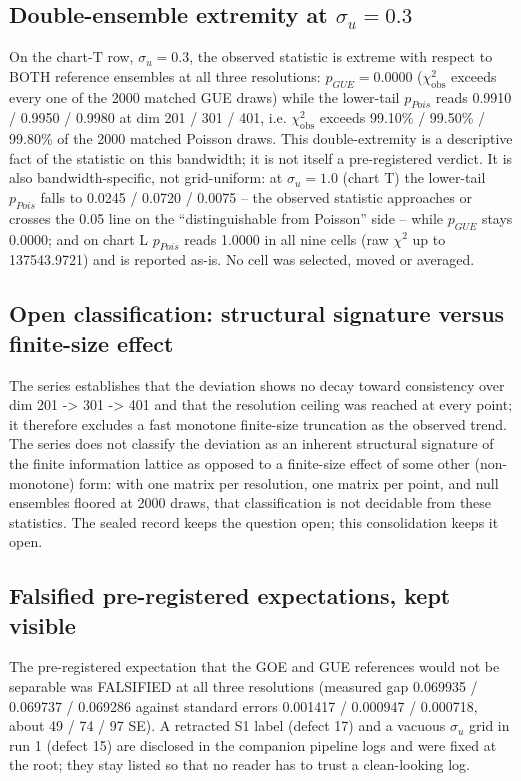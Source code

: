 \documentclass[11pt]{article}
\begin{document}
\subsection{Double-ensemble extremity at $\sigma_u = 0.3$}
On the chart-T row, $\sigma_u = 0.3$, the observed statistic is extreme
with respect to BOTH reference ensembles at all three resolutions:
$p_{GUE} = 0.0000$ ($\chi^2_{\mathrm{obs}}$ exceeds every one of the
2000 matched GUE draws) while the lower-tail $p_{Pois}$ reads 0.9910 /
0.9950 / 0.9980 at dim 201 / 301 / 401, i.e.
$\chi^2_{\mathrm{obs}}$ exceeds 99.10\% / 99.50\% / 99.80\% of the 2000
matched Poisson draws. This double-extremity is a descriptive fact of
the statistic on this bandwidth; it is not itself a pre-registered
verdict. It is also bandwidth-specific, not grid-uniform: at
$\sigma_u = 1.0$ (chart T) the lower-tail $p_{Pois}$ falls to 0.0245 /
0.0720 / 0.0075 -- the observed statistic approaches or crosses the
0.05 line on the ``distinguishable from Poisson'' side -- while
$p_{GUE}$ stays 0.0000; and on chart L $p_{Pois}$ reads 1.0000 in all
nine cells (raw $\chi^2$ up to 137543.9721) and is reported as-is. No
cell was selected, moved or averaged.

\subsection{Open classification: structural signature versus
finite-size effect}
The series establishes that the deviation shows no decay toward
consistency over dim 201 -> 301 -> 401 and that the resolution ceiling
was reached at every point; it therefore excludes a fast monotone
finite-size truncation as the observed trend. The series does not
classify the deviation as an inherent structural signature of the
finite information lattice as opposed to a finite-size effect of some
other (non-monotone) form: with one matrix per resolution, one matrix
per point, and null ensembles floored at 2000 draws, that classification
is not decidable from these statistics. The sealed record keeps the
question open; this consolidation keeps it open.

\subsection{Falsified pre-registered expectations, kept visible}
The pre-registered expectation that the GOE and GUE references would
not be separable was FALSIFIED at all three resolutions (measured gap
0.069935 / 0.069737 / 0.069286 against standard errors 0.001417 /
0.000947 / 0.000718, about 49 / 74 / 97 SE). A retracted S1 label
(defect 17) and a vacuous $\sigma_u$ grid in run 1 (defect 15) are
disclosed in the companion pipeline logs and were fixed at the root;
they stay listed so that no reader has to trust a clean-looking log.
\end{document}
